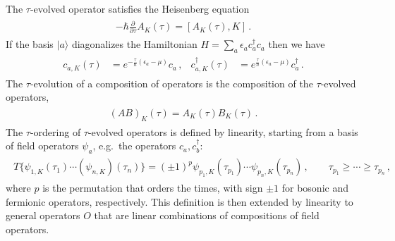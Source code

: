 \documentclass[../QFT_main.tex]{subfiles}
\begin{document}
\begin{mytheorem}
The $\tau$-evolved operator satisfies the Heisenberg equation
{\small\begin{align}\begin{aligned}
    -\hbar\tfrac{\partial}{\partial\tau}A_K(\tau)=[A_K(\tau),K]\,.
\end{aligned}\end{align}}
If the basis $|a\rangle$ diagonalizes the Hamiltonian $H=\sum_a\epsilon_a c_a^\dagger c_a$ then we have
{\small\begin{align}\begin{aligned}
    c_{a,K}(\tau)&=e^{-\tfrac{\tau}{\hbar}(\epsilon_a-\mu)}c_a\,,
    &
    c_{a,K}^\dagger(\tau)&=e^{\tfrac{\tau}{\hbar}(\epsilon_a-\mu)}c_a^\dagger\,.
\end{aligned}\end{align}}
The $\tau$-evolution of a composition of operators is the composition of the $\tau$-evolved operators,
{\small\begin{align}\begin{aligned}
    (AB)_K(\tau)=A_K(\tau)B_K(\tau)\,.
\end{aligned}\end{align}}
%
The $\tau$-ordering of $\tau$-evolved operators is defined by linearity, starting from a basis of field operators $\psi_a$, e.g.\ the operators $c_a,c_b^\dagger$:
{\small\begin{align}\begin{aligned}
    T\big\{\psi_{1,K}(\tau_1)\cdots(\psi_{n,K})(\tau_n)\big\}
    =
    (\pm1)^p
    \psi_{p_1,K}(\tau_{p_1})\cdots\psi_{p_n,K}(\tau_{p_n})\,,
    \qquad
    \tau_{p_1}\geq\cdots\geq\tau_{p_n}\,,
\end{aligned}\end{align}}
where $p$ is the permutation that orders the times, with sign $\pm1$ for bosonic and fermionic operators, respectively.
This definition is then extended by linearity to general operators $O$ that are linear combinations of compositions of field operators.
\end{mytheorem}
\end{document}
